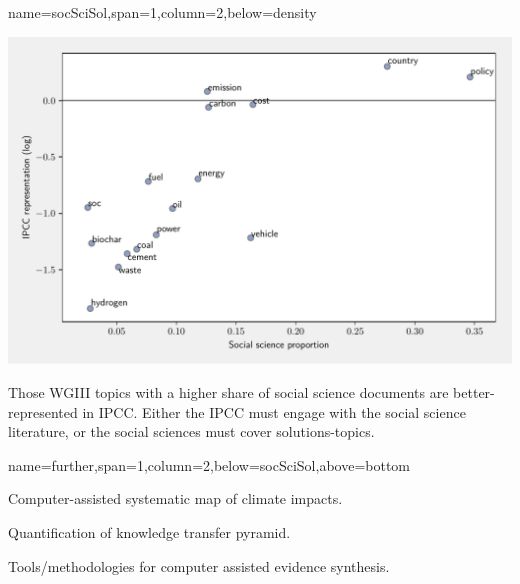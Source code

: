 \documentclass[a0paper,portrait]{baposter}
\begin{document}
\begin{poster}
{name=socSciSol,span=1,column=2,below=density}{
	\begin{center}
		\includegraphics[width=0.98\linewidth]{../plots/run_1771_wg3_socsci.pdf}
	\end{center}
	\vspace{-1.4em}
Those WGIII topics with a higher share of social science documents are better-represented in IPCC. Either the IPCC must engage with the social science literature, or the social sciences must cover solutions-topics.
}

{name=further,span=1,column=2,below=socSciSol,above=bottom}{

Computer-assisted systematic map of climate impacts.

Quantification of knowledge transfer pyramid.

Tools/methodologies for computer assisted evidence synthesis.





}


\end{poster}
\end{document}
